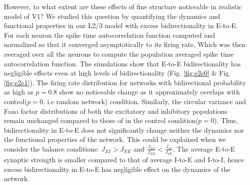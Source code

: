 However, to what extent are these effects of fine structure noticeable in realistic model of V1?  We studied this question by quantifying the dynamics and functional properties in our L2/3 model with excess bidirectionality in E-to-E. For each neuron the spike time autocorrelation function computed and normalized so that it converged asymptotically to its firing rate. Which was then averaged over all the neurons  to compute the population averaged spike time autocorrelation function. The simulations show that E-to-E bidirectionality has negligible effects even at high levels of bidirectionality (Fig. \ref{fig:e2e0} \& Fig. \ref{fig:e2e1}). The firing rate distribution for networks with bidirectional probability as high as $p = 0.8$ show no noticeable change as it approximately overlaps with control($p = 0$, i.e random network) condition. Similarly, the circular variance and Fano factor distributions of both the excitatory and inhibitory populations remain unchanged compared to those of in the control condition($p=0$). Thus, bidirectionality in E-to-E does not significantly change neither the dynamics nor the functional properties of the network. This could be explained when we consider the balance conditions: $J_{EI} > J_{EE}$ and $\frac{J_{EI}}{J_{EE}} < \frac{J_{II}}{J_{IE}}$. The average E-to-E synaptic strength is smaller compared to that of average I-to-E and I-to-I, hence excess bidirectionality in E-to-E has negligible effect on the dynamics of the network. \\

